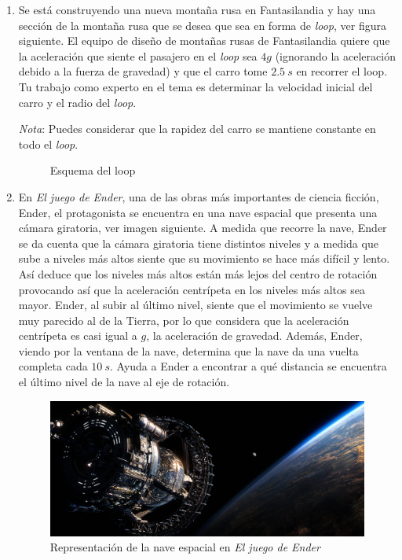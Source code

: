 \documentclass[letterpaper]{article}
\begin{document}
\begin{enumerate}

\item Se está construyendo una nueva montaña rusa en Fantasilandia y hay una sección de la montaña rusa que se desea que sea en forma de \emph{loop}, ver figura siguiente. El equipo de diseño de montañas rusas de Fantasilandia quiere que la aceleración que siente el pasajero en el \emph{loop} sea $4g$ (ignorando la aceleración debido a la fuerza de gravedad) y que el carro tome $2.5\ \si{s}$ en recorrer el loop. Tu trabajo como experto en el tema es determinar la velocidad inicial del carro y el radio del \emph{loop}.
 
\emph{Nota}: Puedes considerar que la rapidez del carro se mantiene constante en todo el \emph{loop}.

\begin{figure}[h]
\centering
{}
\caption{Esquema del loop}
\end{figure}
 
\item En \emph{El juego de Ender}, una de las obras más importantes de ciencia ficción, Ender, el protagonista se encuentra en una nave espacial que presenta una cámara giratoria, ver imagen siguiente. A medida que recorre la nave, Ender se da cuenta que la cámara giratoria tiene distintos niveles y a medida que sube a niveles más altos siente que su movimiento se hace más difícil y lento.  Así deduce que los niveles más altos están más lejos del centro de rotación provocando así que la aceleración centrípeta en los niveles más altos sea mayor. Ender, al subir al último nivel, siente que el movimiento se vuelve muy parecido al de la Tierra, por lo que considera que la aceleración centrípeta es casi igual a $g$, la aceleración de gravedad. Además, Ender, viendo por la ventana de la nave, determina que la nave da una vuelta completa cada $10\ \si{s}$. Ayuda a Ender a encontrar a qué distancia se encuentra el último nivel de la nave al eje de rotación.

\begin{figure}[h]
\centering
\includegraphics[scale=0.4]{ender.jpg}
\caption{Representación de la nave espacial en \emph{El juego de Ender}}
\end{figure}


\end{enumerate}
\end{document}
